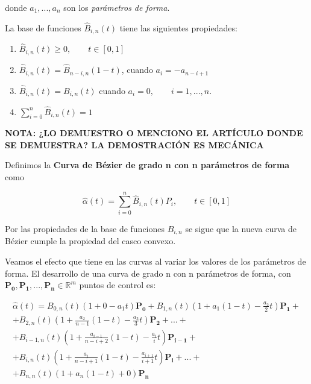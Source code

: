 \documentclass{article}
\newcommand{\R}{\mathbb{R}}
\begin{document}
donde $a_1,...,a_n$ son los \textit{parámetros de forma}. \newline

La base de funciones $\hat{B}_{i,n}(t)$ tiene las siguientes propiedades:
\begin{enumerate}
	\item $\hat{B}_{i,n}(t) \geq 0, \qquad t \in [0,1]$
	\item $\hat{B}_{i,n}(t) = \hat{B}_{n-i,n}(1-t)$, cuando $a_i = -a_{n-i+1}$
	\item $\hat{B}_{i,n}(t) = B_{i,n}(t)$ cuando $a_i = 0, \qquad i=1,...,n$.
	\item $\sum_{i=0}^{n}\hat{B}_{i,n}(t) = 1$
\end{enumerate}

\textbf{NOTA: ¿LO DEMUESTRO O MENCIONO EL ARTÍCULO DONDE SE DEMUESTRA? LA DEMOSTRACIÓN ES MECÁNICA}
\newline


Definimos la \textbf{Curva de Bézier de grado n con n parámetros de forma} como

\begin{equation}
\hat{\alpha}(t) = \sum_{i=0}^{n}\hat{B}_{i,n}(t)P_i, \qquad t \in [0,1]
\end{equation}

Por las propiedades de la base de funciones $\hat{B}_{i,n}$ se sigue que la nueva curva de Bézier cumple la propiedad del casco convexo.
\newline

Veamos el efecto que tiene en las curvas al variar los valores de los parámetros de forma.
El desarrollo de una curva de grado n con n parámetros de forma, con $\mathbf{P_0,P_1,...,P_n} \in \R^m$ puntos de control es:

\begin{gather*}
\hat{\alpha}(t) = B_{0,n}(t)\left(1 + 0 - a_1 t\right)\mathbf{P_0} + B_{1,n}(t)\left(1 + a_1 (1-t) - \frac{a_2}{2}t\right)\mathbf{P_1} + \\
+ B_{2,n}(t)\left(1 + \frac{a_2}{n-1}(1-t) - \frac{a_3}{3}t \right)\mathbf{P_2} + ... + \\
+ B_{i-1,n}(t)\left(1 + \frac{a_{i-1}}{n-i+2}(1-t) - \frac{a_i}{i}t \right) \mathbf{P_{i-1}} + \\
+ B_{i,n}(t) \left(1 + \frac{a_i}{n-i+1}(1-t) - \frac{a_{i+1}}{i+1}t \right) \mathbf{P_i} +...+ \\
+ B_{n,n}(t) \left(1 + a_n (1-t) + 0 \right) \mathbf{P_n}
\end{gather*}
\end{document}
